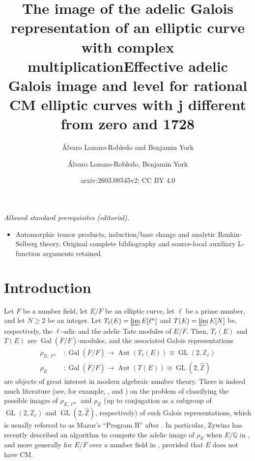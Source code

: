 \documentclass[11pt]{amsart}
\title[The adelic Galois image of an elliptic curve with complex multiplication]{The image of the adelic Galois representation of an elliptic curve with complex multiplication}
\author{\'Alvaro Lozano-Robledo and Benjamin York}
\title{Effective adelic Galois image and level for rational CM elliptic curves with j different from zero and 1728}
\author{Álvaro Lozano-Robledo, Benjamin York}
\date{arxiv:2603.08545v2; CC BY 4.0}
\theoremstyle{definition}
\newcommand{\Q}{\mathbb{Q}}
\newcommand{\Z}{\mathbb{Z}}
\newcommand{\Gal}{\operatorname{Gal}}
\newcommand{\Aut}{\operatorname{Aut}}
\newcommand{\GL}{\operatorname{GL}}
\begin{document}
\maketitle
\noindent\textit{Allowed standard prerequisites (editorial).}\begin{itemize}
\item Automorphic tensor products, induction/base change and analytic Rankin-Selberg theory. Original complete bibliography and source-local auxiliary L-function arguments retained.
\end{itemize}\medskip
\section{Introduction}

Let $F$ be a number field, let $E/F$ be an elliptic curve, let $\ell$ be a prime number, and let $N\geq 2$ be an integer. Let $T_\ell(E)=\varprojlim E[\ell^n]$ and $T(E)=\varprojlim E[N]$ be, respectively, the $\ell$-adic and the adelic Tate modules of $E/F$. Then, $T_\ell(E)$ and $T(E)$ are $\Gal(\overline{F}/F)$-modules, and the associated Galois representations
\begin{align*}
   \rho_{E,\ell^{\infty}} &\colon \Gal(\overline{F}/F)\to \Aut(T_\ell(E))\cong \GL(2,\Z_\ell)\\
      \rho_{E} &\colon \Gal(\overline{F}/F)\to \Aut(T(E))\cong \GL(2,\widehat{\Z})
\end{align*}
are objects of great interest in modern algebraic number theory. There is indeed much literature (see, for example, \cite{2adic}, \cite{elladic} and \cite{zywina}) on the problem of classifying the possible images of $\rho_{E,\ell^\infty}$ and $\rho_E$ (up to conjugation as a subgroup of $\GL(2,\Z_\ell)$ and $\GL(2,\widehat{\Z})$, respectively) of such Galois representations, which is usually referred to as Mazur's ``Program B'' after \cite{mazurprogramb}. In particular, Zywina has recently described an algorithm to compute the adelic image of $\rho_E$ when $E/\Q$ in \cite{zywinaadelic1}, and more generally for $E/F$ over a number field in \cite{zywinaadelic2}, provided that $E$ does not have CM. 
\end{document}
